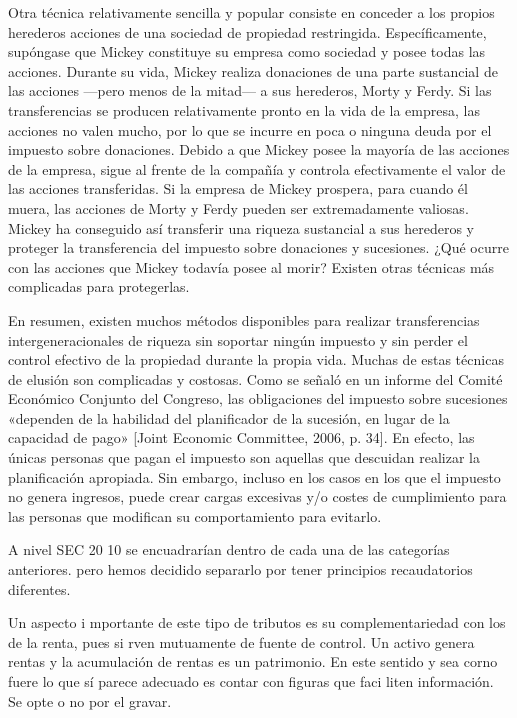 \documentclass[10pt,a4paper]{article}
\begin{document}
Otra técnica relativamente sencilla y popular consiste en conceder a los propios herederos acciones de una sociedad de propiedad restringida. Específicamente, supóngase que Mickey constituye su empresa como sociedad y posee todas las acciones. Durante su vida, Mickey realiza donaciones de una parte sustancial de las acciones —pero menos de la mitad— a sus herederos, Morty y Ferdy. Si las transferencias se producen relativamente pronto en la vida de la empresa, las acciones no valen mucho, por lo que se incurre en poca o ninguna deuda por el impuesto sobre donaciones. Debido a que Mickey posee la mayoría de las acciones de la empresa, sigue al frente de la compañía y controla efectivamente el valor de las acciones transferidas. Si la empresa de Mickey prospera, para cuando él muera, las acciones de Morty y Ferdy pueden ser extremadamente valiosas. Mickey ha conseguido así transferir una riqueza sustancial a sus herederos y proteger la transferencia del impuesto sobre donaciones y sucesiones. ¿Qué ocurre con las acciones que Mickey todavía posee al morir? Existen otras técnicas más complicadas para protegerlas.

En resumen, existen muchos métodos disponibles para realizar transferencias intergeneracionales de riqueza sin soportar ningún impuesto y sin perder el control efectivo de la propiedad durante la propia vida. Muchas de estas técnicas de elusión son complicadas y costosas. Como se señaló en un informe del Comité Económico Conjunto del Congreso, las obligaciones del impuesto sobre sucesiones «dependen de la habilidad del planificador de la sucesión, en lugar de la capacidad de pago» [Joint Economic Committee, 2006, p. 34]. En efecto, las únicas personas que pagan el impuesto son aquellas que descuidan realizar la planificación apropiada. Sin embargo, incluso en los casos en los que el impuesto no genera ingresos, puede crear cargas excesivas y/o costes de cumplimiento para las personas que modifican su comportamiento para evitarlo.






A nivel SEC 20 10 se encuadrarían dentro de cada una de las categorías anteriores. pero hemos decidido separarlo por tener principios recaudatorios diferentes.



Un aspecto i mportante de este tipo de tributos es su complementariedad con los de la renta, pues si rven mutuamente de fuente de control. Un activo genera rentas y la acumulación de rentas es un patrimonio. En este sentido y sea corno fuere lo que sí parece adecuado es contar con figuras que faci liten información. Se opte o no por el gravar.
\end{document}
